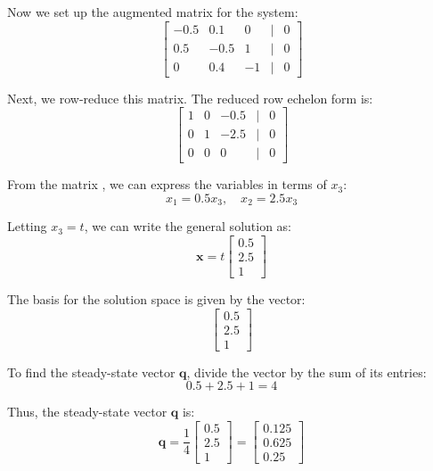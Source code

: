 \documentclass[11pt]{exam}
\begin{document}
\begin{questions}
\begin{parts}
Now we set up the augmented matrix for the system:
\[
\begin{bmatrix}
-0.5 & 0.1 & 0 & | & 0 \\
0.5 & -0.5 & 1 & | & 0 \\
0 & 0.4 & -1 & | & 0
\end{bmatrix}
\]

Next, we row-reduce this matrix. The reduced row echelon form is:
\[
\begin{bmatrix}
1 & 0 & -0.5 & | & 0 \\
0 & 1 & -2.5 & | & 0 \\
0 & 0 & 0 & | & 0
\end{bmatrix}
\]

From the matrix , we can express the variables in terms of \( x_3 \):
\[
x_1 = 0.5x_3, \quad x_2 = 2.5x_3
\]

Letting \( x_3 = t \), we can write the general solution as:
\[
\mathbf{x} = t \begin{bmatrix}
0.5 \\
2.5 \\
1
\end{bmatrix}
\]

The basis for the solution space is given by the vector:
\[
\begin{bmatrix}
0.5 \\
2.5 \\
1
\end{bmatrix}
\]

To find the steady-state vector \( \mathbf{q} \), divide the vector by the sum of its entries:
\[
0.5 + 2.5 + 1 = 4
\]

Thus, the steady-state vector \( \mathbf{q} \) is:
\[
\mathbf{q} = \frac{1}{4} \begin{bmatrix}
0.5 \\
2.5 \\
1
\end{bmatrix} = \begin{bmatrix}
0.125 \\
0.625 \\
0.25
\end{bmatrix}
\]

\end{parts}



  \newpage

\end{questions}
\end{document}
